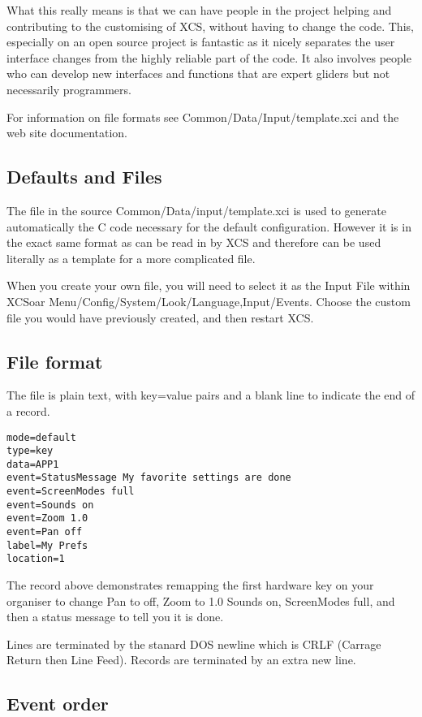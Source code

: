 What this really means is that we can have people in the project
helping and contributing to the customising of XCS, without having to
change the code. This, especially on an open source project is
fantastic as it nicely separates the user interface changes from the
highly reliable part of the code. It also involves people who can
develop new interfaces and functions that are expert gliders but not
necessarily programmers.

For information on file formats see Common/Data/Input/template.xci and
the web site documentation.


\subsection{Defaults and Files}

The file in the source Common/Data/input/template.xci is used to generate
automatically the C code necessary for the default configuration. However it is
in the exact same format as can be read in by XCS and therefore can be used
literally as a template for a more complicated file.

When you create your own file, you will need to select it as the Input File
within XCSoar Menu/Config/System/Look/Language,Input/Events. Choose 
the custom file you would have previously created, and then restart XCS.


\subsection{File format}

The file is plain text, with key=value pairs and a blank line to indicate
the end of a record.

\begin{verbatim}
mode=default
type=key
data=APP1
event=StatusMessage My favorite settings are done
event=ScreenModes full
event=Sounds on
event=Zoom 1.0
event=Pan off
label=My Prefs
location=1
\end{verbatim}

The record above demonstrates remapping the first hardware key on your
organiser to change Pan to off, Zoom to 1.0 Sounds on, ScreenModes
full, and then a status message to tell you it is done.

Lines are terminated by the stanard DOS newline which is CRLF (Carrage
Return then Line Feed). Records are terminated by an extra new line.

\subsection{Event order}

